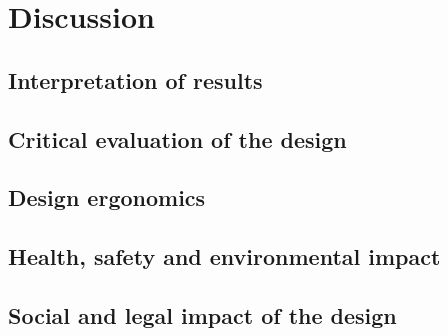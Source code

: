 
\section{Discussion}

\subsection{Interpretation of results}

\subsection{Critical evaluation of the design}

\subsection{Design ergonomics}

\subsection{Health, safety and environmental impact}

\subsection{Social and legal impact of the design}


\newpage



